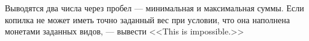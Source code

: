 Выводятся два числа через пробел --- минимальная и максимальная суммы.
Если копилка не может иметь точно заданный вес при условии,
что она наполнена монетами заданных видов, ---
вывести <<This is impossible.>>
